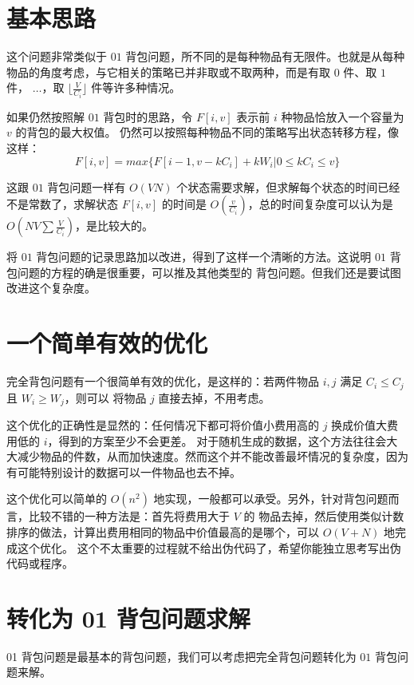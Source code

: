 \documentclass[cn, 11pt, chinese, toc=twocol]{elegantbook}
\begin{document}
\section{基本思路}

这个问题非常类似于 $01$ 背包问题，所不同的是每种物品有无限件。也就是从每种物品的角度考虑，与它相关的策略已并非取或不取两种，而是有取 $0$ 件、取 $1$ 件， $\dots$，取 $\lfloor \frac{V}{C_i} \rfloor$ 件等许多种情况。

如果仍然按照解 $01$ 背包时的思路，令 $F[i, v]$ 表示前 $i$ 种物品恰放入一个容量为 $v$ 的背包的最大权值。
仍然可以按照每种物品不同的策略写出状态转移方程，像这样：
\begin{equation}
  F[i, v] = max \{ F[i - 1, v - kC_i] + kW_i | 0 \le kC_i \le v \}
\end{equation}

这跟 $01$ 背包问题一样有 $O(VN)$ 个状态需要求解，但求解每个状态的时间已经不是常数了，求解状态 $F[i, v]$ 的时间是
$O(\frac{v}{C_i})$，总的时间复杂度可以认为是 $O(NV\sum\frac{V}{C_i})$，是比较大的。

将 $01$ 背包问题的记录思路加以改进，得到了这样一个清晰的方法。这说明 $01$ 背包问题的方程的确是很重要，可以推及其他类型的
背包问题。但我们还是要试图改进这个复杂度。

\section{一个简单有效的优化}

完全背包问题有一个很简单有效的优化，是这样的：若两件物品 $i, j$ 满足 $C_i \le C_j$ 且 $W_i \ge W_j$，则可以
将物品 $j$ 直接去掉，不用考虑。

这个优化的正确性是显然的：任何情况下都可将价值小费用高的 $j$ 换成价值大费用低的 $i$，得到的方案至少不会更差。
对于随机生成的数据，这个方法往往会大大减少物品的件数，从而加快速度。然而这个并不能改善最坏情况的复杂度，因为有可能特别设计的数据可以一件物品也去不掉。

这个优化可以简单的 $O(n^2)$ 地实现，一般都可以承受。另外，针对背包问题而言，比较不错的一种方法是：首先将费用大于 $V$ 的
物品去掉，然后使用类似计数排序的做法，计算出费用相同的物品中价值最高的是哪个，可以 $O(V + N )$ 地完成这个优化。
这个不太重要的过程就不给出伪代码了，希望你能独立思考写出伪代码或程序。

\section{转化为 01 背包问题求解}

01 背包问题是最基本的背包问题，我们可以考虑把完全背包问题转化为 $01$ 背包问题来解。
\end{document}
